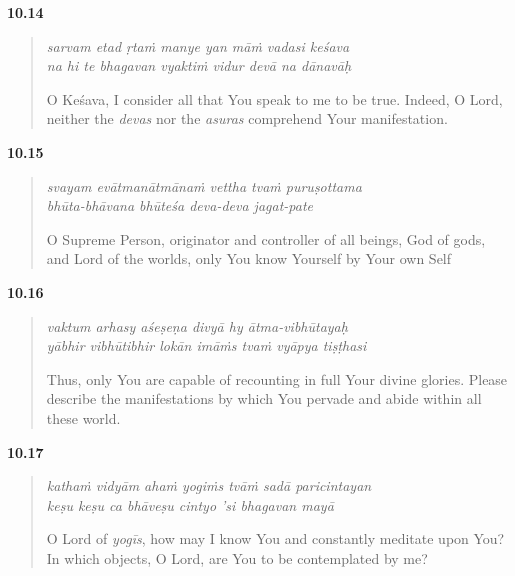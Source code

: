 \par\noindent\textbf{10.14}\par
\begin{verse}
\textit{sarvam etad ṛtaṁ manye yan māṁ vadasi keśava} \\
\textit{na hi te bhagavan vyaktiṁ vidur devā na dānavāḥ}

\noindent O Keśava, I consider all that You speak to me to be true. Indeed, O Lord, neither the \textit{devas} nor the \textit{asuras} comprehend Your manifestation.
\end{verse}
\par



\par\noindent\textbf{10.15}\par
\begin{verse}
\textit{svayam evātmanātmānaṁ vettha tvaṁ puruṣottama} \\
\textit{bhūta-bhāvana bhūteśa deva-deva jagat-pate}

\noindent O Supreme Person, originator and controller of all beings, God of gods, and Lord of the worlds, only You know Yourself by Your own Self
\end{verse}
\par



\par\noindent\textbf{10.16}\par
\begin{verse}
\textit{vaktum arhasy aśeṣeṇa divyā hy ātma-vibhūtayaḥ} \\
\textit{yābhir vibhūtibhir lokān imāṁs tvaṁ vyāpya tiṣṭhasi}

\noindent Thus, only You are capable of recounting in full Your divine glories. Please describe the manifestations by which You pervade and abide within all these world.
\end{verse}
\par



\par\noindent\textbf{10.17}\par
\begin{verse}
\textit{kathaṁ vidyām ahaṁ yogiṁs tvāṁ sadā paricintayan} \\
\textit{keṣu keṣu ca bhāveṣu cintyo ’si bhagavan mayā}

\noindent O Lord of \textit{yogīs}, how may I know You and constantly meditate upon You? In which objects, O Lord, are You to be contemplated by me?
\end{verse}
\par



